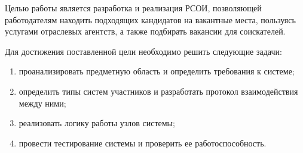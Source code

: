 Целью работы является разработка и реализация РСОИ, позволяющей работодателям находить подходящих кандидатов на вакантные места, пользуясь услугами отраслевых агентств, а также подбирать вакансии для соискателей. 

Для достижения поставленной цели необходимо решить следующие задачи:

\begin{enumerate}
\item проанализировать предметную область и определить требования к системе;
\item определить типы систем участников и разработать протокол взаимодействия между ними;
\item реализовать логику работы узлов системы;
\item провести тестирование системы и проверить ее работоспособность.
\end{enumerate}
